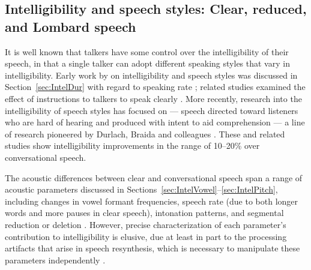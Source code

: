 
\subsection[Intelligibility and speech styles]{Intelligibility and speech styles: Clear, reduced, and Lombard speech\label{sec:SpeechStyle}}
It is well known that talkers have some control over the intelligibility of their speech, in that a single talker can adopt different speaking styles that vary in intelligibility.  Early work by \citeauthor{Tolhurst1957a} on intelligibility and speech styles was discussed in Section~\ref{sec:IntelDur} with regard to speaking rate \citep{Tolhurst1957a}; related studies examined the effect of instructions to talkers to speak clearly \citep{Tolhurst1954, Tolhurst1955}.  More recently, research into the intelligibility of speech styles has focused on  — speech directed toward listeners who are hard of hearing and produced with intent to aid comprehension — a line of research pioneered by Durlach, Braida and colleagues \citep[\eg][]{PichenyEtAl1985, PichenyEtAl1986, PichenyEtAl1989, UchanskiEtAl1996, KrauseBraida2004}.  These and related studies show intelligibility improvements in the range of 10–20\% over conversational speech.

The acoustic differences between clear and conversational speech span a range of acoustic parameters discussed in Sections~\ref{sec:IntelVowel}–\ref{sec:IntelPitch}, including changes in vowel formant frequencies, speech rate (due to both longer words and more pauses in clear speech), intonation patterns, and segmental reduction or deletion \citep[see][\intal]{PichenyEtAl1986, LiLoizou2008, SmiljanicBradlow2008, HazanBaker2011}.  However, precise characterization of each parameter’s contribution to intelligibility is elusive, due at least in part to the processing artifacts that arise in speech resynthesis, which is necessary to manipulate these parameters independently \citep[cf. discussions in][]{PichenyEtAl1989, UchanskiEtAl1996, LiuZeng2006, KrauseBraida2009}.

